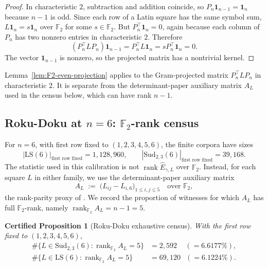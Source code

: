 \documentclass[11pt,a4paper]{article}
\newtheorem{certprop}[theorem]{Certified Proposition}
\theoremstyle{definition}
\theoremstyle{remark}
\providecommand{\one}{\mathbf{1}}
\providecommand{\rank}{\operatorname{rank}}
\newcommand{\Ehat}{\widehat{E}_{\gamma,L}}
\begin{document}
\begin{proof}
In characteristic $2$, subtraction and addition coincide, so
$P_n\one_{n-1}=\one_n$ because $n-1$ is odd. Since each row of a Latin
square has the same symbol sum, $L\one_n=s\one_n$ over $\mathbb{F}_2$
for some $s\in\mathbb{F}_2$. But $P_n^{\!\top}\one_n=0$, again because
each column of $P_n$ has two nonzero entries in characteristic $2$.
Therefore
\begin{equation*}
   (P_n^{\!\top} L P_n)\one_{n-1}
      = P_n^{\!\top}L\one_n
      = s P_n^{\!\top}\one_n
      = 0.
\end{equation*}
The vector $\one_{n-1}$ is nonzero, so the projected matrix has a
nontrivial kernel.
\end{proof}

Lemma~\ref{lem:F2-even-projection} applies to the Gram-projected matrix
$P_n^{\!\top}LP_n$ in characteristic $2$. It is separate from the
determinant-paper auxiliary matrix $A_L$ used in the census below,
which can have rank $n-1$.

\subsection{\texorpdfstring{Roku-Doku at $n = 6$: $\mathbb{F}_2$-rank census}{Roku-Doku at n=6: F2-rank census}}\label{sec:n6}

For $n = 6$, with first row fixed to $(1,2,3,4,5,6)$, the finite
corpora have sizes
\begin{equation*}
   |\mathrm{LS}(6)|_{\text{first row fixed}}=1{,}128{,}960,
   \qquad
   |\mathrm{Sud}_{2,3}(6)|_{\text{first row fixed}}=39{,}168.
\end{equation*}
The statistic used in this calibration is not $\rank \Ehat$ over
$\mathbb{F}_2$. Instead, for each square $L$ in either family, we use
the determinant-paper auxiliary matrix
\begin{equation*}
   A_L \;:=\; \bigl(L_{ij}-L_{i,6}\bigr)_{1\le i,j\le 5}
   \quad \text{over }\mathbb{F}_2,
\end{equation*}
the rank-parity proxy of \cite{HAN-RankParity}. We record the
proportion of witnesses for which $A_L$ has full $\mathbb{F}_2$-rank,
namely $\rank_{\mathbb{F}_2} A_L = n - 1 = 5$.

\begin{certprop}[Roku-Doku exhaustive census]\label{prop:n6-census}
With the first row fixed to $(1,2,3,4,5,6)$,
\begin{align*}
   \#\bigl\{ L \in \mathrm{Sud}_{2,3}(6) : \rank_{\mathbb{F}_2} A_L = 5 \bigr\}
      &= 2{,}592 \;\;\;\,\,(=\!6.6177\%), \\
   \#\bigl\{ L \in \mathrm{LS}(6) : \rank_{\mathbb{F}_2} A_L = 5 \bigr\}
      &= 69{,}120 \;\;\,(=\!6.1224\%).
\end{align*}
\end{certprop}
\end{document}
